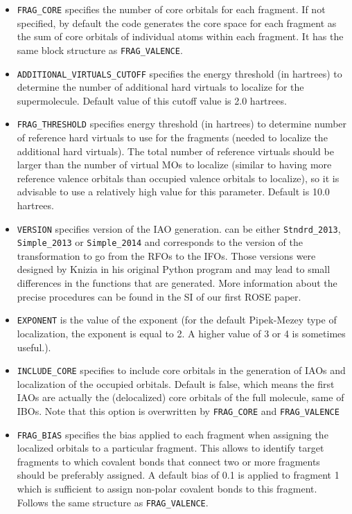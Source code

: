 \documentclass[preprint]{revtex4-1}
\begin{document}
\begin{itemize}
\begin{itemize}
\textit{fragment \#}\\
\textit{\# of valence orbitals}\\
\item \verb|FRAG_CORE| specifies the number of core orbitals for each fragment. If not specified, by default the code generates the core space for each fragment as the sum of core orbitals of individual atoms within each fragment. It has the same block structure as \verb|FRAG_VALENCE|.
\item \verb|ADDITIONAL_VIRTUALS_CUTOFF| specifies the energy threshold (in hartrees) to determine the number of additional hard virtuals to localize for the supermolecule. Default value of this cutoff value is 2.0 hartrees.
\item \verb|FRAG_THRESHOLD| specifies energy threshold (in hartrees) to determine number of reference hard virtuals to use for the fragments (needed to localize the additional hard virtuals). The total number of reference virtuals should be larger 
than the number of virtual MOs to localize (similar to having more reference valence orbitals than occupied valence orbitals to localize), so it is advisable to use a relatively high value for this parameter.  Default is 10.0 hartrees.

\item \verb|VERSION| specifies version of the IAO generation. can be either \verb|Stndrd_2013|, \verb|Simple_2013| or
\verb|Simple_2014| and corresponds to the version of the transformation to go from the
RFOs to the IFOs.
Those versions were designed by Knizia in his original Python program and may lead to small differences in the functions that are generated. More information
about the precise procedures can be found in the SI of our first ROSE paper\cite{ROSE1}.
\item \verb|EXPONENT| is the value of the exponent (for the default Pipek-Mezey type of localization, the exponent is equal to 2. A higher value of 3 or 4 is sometimes useful.).
\item \verb|INCLUDE_CORE| specifies to include core orbitals in the generation of IAOs and localization of the occupied orbitals. Default is false, which means the first IAOs are actually the (delocalized) core orbitals of the full molecule, same of IBOs.
Note that this option is overwritten by \verb|FRAG_CORE| and \verb|FRAG_VALENCE|
\item \verb|FRAG_BIAS| specifies the bias applied to each fragment when assigning the localized orbitals to a particular fragment. This allows to identify target fragments to which covalent bonds that connect two or more fragments should be preferably assigned.
A default bias of 0.1 is applied to fragment 1 which is sufficient to assign non-polar covalent bonds to this fragment. Follows the same structure as \verb|FRAG_VALENCE|.


\end{itemize}
\end{itemize}
\end{document}
